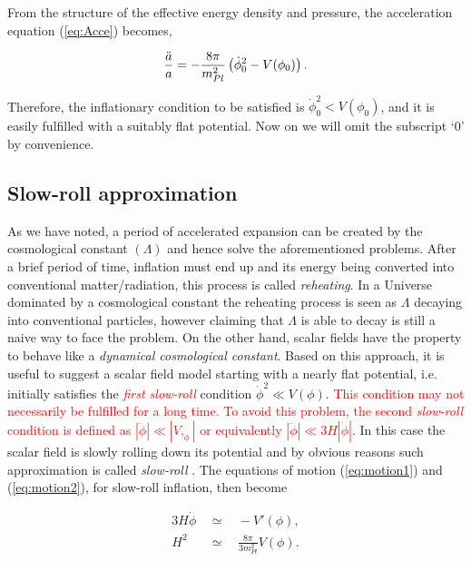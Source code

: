 \documentclass{rmaa}
\def\beq{\begin{equation}}
\def\eeq{\end{equation}}
\def\bea{\begin{eqnarray}}
\def\eea{\end{eqnarray}}
\begin{document}
 From the structure of the effective energy density and pressure, the acceleration
  equation (\ref{eq:Acce}) becomes, 
 
 \beq
 {\ddot a \over a} = -{8\pi \over m_{Pl}^2}\left(\dot \phi_0^2-V(\phi_0) \right).
 \eeq
 
 \noindent
 Therefore, the inflationary condition to be satisfied is $\dot \phi_0^2 < V(\phi_0)$, and 
 it is easily fulfilled with a suitably flat potential. Now on we will omit the subscript
 `0' by convenience.



\subsection{Slow-roll approximation}
\vskip 6pt

As we have noted, a period of accelerated expansion can be created by 
the cosmological constant $(\Lambda)$ and hence solve the aforementioned problems.
After a brief period of time, inflation must end up and its energy being converted into conventional
matter/radiation, this process is called \textit{reheating}. In a Universe dominated by a 
cosmological constant the reheating process is seen as $\Lambda$ decaying into 
conventional particles, however claiming that $\Lambda$ is able to decay is still a 
naive way to face the problem.   
%
On the other hand, scalar fields have the property to behave like a 
\textit{dynamical cosmological constant}. Based on this approach, it is useful to
suggest a scalar field model starting with a nearly flat potential, i.e. initially 
satisfies the \textcolor{red}{\textit{first slow-roll}} condition $\dot \phi^2 \ll V(\phi)$. 
\textcolor{red}{This condition may not necessarily be fulfilled for a long time.
To avoid this problem, the second \textit{slow-roll} condition is defined as 
$|\ddot{\phi}|\ll |V,_{\phi}|$ or equivalently $|\ddot{\phi}|\ll 3H|\dot{\phi}|$}. In this case the scalar field is slowly rolling 
down its potential and by obvious reasons such approximation is called \textit{slow-roll} 
\citep{Liddle92, Liddle94}.
The equations of motion (\ref{eq:motion1}) 
 and (\ref{eq:motion2}), for slow-roll inflation, then become
 
\bea \label{eq:slow}
3H\dot{\phi} ~~ &\simeq& ~~ -V'(\phi), \\
H^2 ~~ & \simeq& ~~ \frac{8\pi}{3m^2_{Pl}} V(\phi). \label{eq:slow2}
\eea
\end{document}
